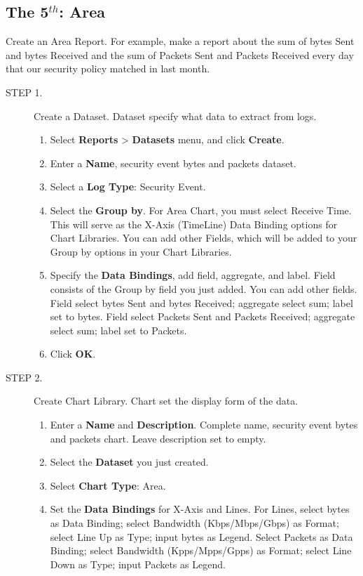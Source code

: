 \subsection*{\hypertarget{link:The 5th: Area}{The 5$^{th}$: Area}}
\label{sec:appendix_f:report:area}

Create an Area Report. For example, make a report about the sum of bytes Sent and bytes Received and the sum of Packets Sent and Packets Received every day that our security policy matched in last month.

\begin{description}
    \item[STEP 1.]	Create a Dataset. Dataset specify what data to extract from logs.
    \begin{enumerate}
        \item Select \textbf{Reports} > \textbf{Datasets} menu, and click \textbf{Create}.
        \item Enter a \textbf{Name}, security event bytes and packets dataset.
        \item Select a \textbf{Log Type}: Security Event.
        \item Select the \textbf{Group by}. For Area Chart, you must select Receive Time. This will serve as the X-Axis (TimeLine) Data Binding options for Chart Libraries. You can add other Fields, which will be added to your Group by options in your Chart Libraries.
        \item Specify the \textbf{Data Bindings}, add field, aggregate, and label. Field consists of the Group by field you just added. You can add other fields. Field select bytes Sent and bytes Received; aggregate select sum; label set to bytes. Field select Packets Sent and Packets Received; aggregate select sum; label set to Packets.
        \item Click \textbf{OK}.
    \end{enumerate}
    \item[STEP 2.]	Create Chart Library. Chart set the display form of the data.
    \begin{enumerate}
        \item Enter a \textbf{Name} and \textbf{Description}. Complete name, security event bytes and packets chart. Leave description set to empty.
        \item Select the \textbf{Dataset} you just created.
        \item Select \textbf{Chart Type}: Area. 
        \item Set the \textbf{Data Bindings} for X-Axis and Lines. For Lines, select bytes as Data Binding; select Bandwidth (Kbps/Mbps/Gbps) as Format; select Line Up as Type; input bytes as Legend. Select Packets as Data Binding; select Bandwidth (Kpps/Mpps/Gpps) as Format; select Line Down as Type; input Packets as Legend.

\end{enumerate}
\end{description}
